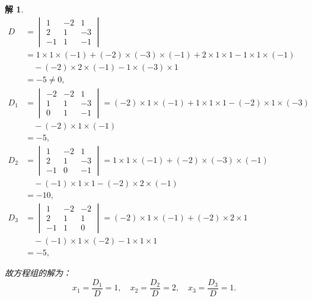 \documentclass[a4paper]{book}
\newtheorem*{solution}{解}
\begin{document}
\begin{solution}
\begin{align*}
D & = \begin{vmatrix} 1 & -2 & 1 \\ 2 & 1 & -3 \\ -1 & 1 & -1 \end{vmatrix} \\
& = 1\times 1\times (-1) + (-2)\times (-3)\times (-1) + 2\times 1\times 1 - 1\times 1\times (-1) \\
& \quad - (-2)\times 2\times (-1) - 1\times (-3)\times 1 \\
& = -5 \neq 0, \\
D_1 & = \begin{vmatrix} -2 & -2 & 1 \\ 1 & 1 & -3 \\ 0 & 1 & -1 \end{vmatrix} = (-2)\times 1\times (-1) + 1\times 1\times 1 - (-2)\times 1\times (-3) \\
& \quad - (-2)\times 1\times (-1) \\
& = -5, \\
D_2 & = \begin{vmatrix} 1 & -2 & 1 \\ 2 & 1 & -3 \\ -1 & 0 & -1 \end{vmatrix}
= 1\times 1\times (-1) + (-2)\times (-3)\times (-1) \\
& \quad - (-1)\times 1\times 1 - (-2)\times 2\times (-1) \\
& = -10, \\
D_3 & = \begin{vmatrix} 1 & -2 & -2 \\ 2 & 1 & 1 \\ -1 & 1 & 0 \end{vmatrix}
 = (-2)\times 1\times (-1) + (-2)\times 2\times 1 \\
& \quad - (-1)\times 1\times (-2) - 1\times 1\times 1 \\
& = -5,
\end{align*}

故方程组的解为：
$$x_1 = \frac{D_1}{D} = 1, \quad x_2 = \frac{D_2}{D} = 2, \quad x_3 = \frac{D_3}{D} = 1.$$
\end{solution}

\vspace{1.5em}
\end{document}
